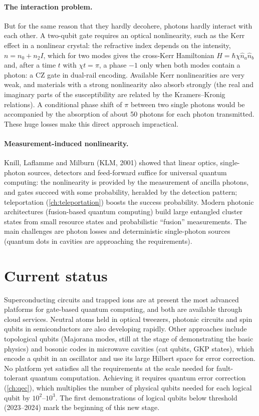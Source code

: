 \paragraph{The interaction problem.} But for the same reason that they hardly decohere, photons hardly interact with each other. A two-qubit gate requires an optical nonlinearity, such as the Kerr effect in a nonlinear crystal: the refractive index
depends on the intensity, $n=n_0+n_2I$, which for two modes gives the cross-Kerr Hamiltonian $H=\hbar\chi\hat n_a\hat n_b$ and, after a time $t$ with $\chi t=\pi$, a phase $-1$ only when both modes contain a photon: a CZ gate in dual-rail encoding.
Available Kerr nonlinearities are very weak, and materials with a strong nonlinearity also absorb strongly (the real and imaginary parts of the susceptibility are related by the Kramers--Kronig relations). A conditional phase shift of $\pi$ between
two single photons would be accompanied by the absorption of about 50 photons for each photon transmitted. These huge losses make this direct approach impractical.

\paragraph{Measurement-induced nonlinearity.} Knill, Laflamme and Milburn (KLM, 2001) showed that linear optics, single-photon sources, detectors and feed-forward suffice for universal quantum computing: the nonlinearity is provided by the measurement
of ancilla photons, and gates succeed with some probability, heralded by the detection pattern; teleportation (\cref{ch:teleportation}) boosts the success probability. Modern photonic architectures (fusion-based quantum computing) build large entangled
cluster states from small resource states and probabilistic ``fusion'' measurements. The main challenges are photon losses and deterministic single-photon sources (quantum dots in cavities are approaching the requirements).

\section{Current status}
Superconducting circuits and trapped ions are at present the most advanced platforms for gate-based quantum computing, and both are available through cloud services. Neutral atoms held in optical tweezers, photonic circuits and spin qubits in
semiconductors are also developing rapidly. Other approaches include topological qubits (Majorana modes, still at the stage of demonstrating the basic physics) and bosonic codes in microwave cavities (cat qubits, GKP states), which encode a qubit in an
oscillator and use its large Hilbert space for error correction. No platform yet satisfies all the requirements at the scale needed for fault-tolerant quantum computation. Achieving it requires quantum error correction (\cref{ch:qec}), which multiplies the
number of physical qubits needed for each logical qubit by $10^2$--$10^3$. The first demonstrations of logical qubits below threshold (2023--2024) mark the beginning of this new stage.

